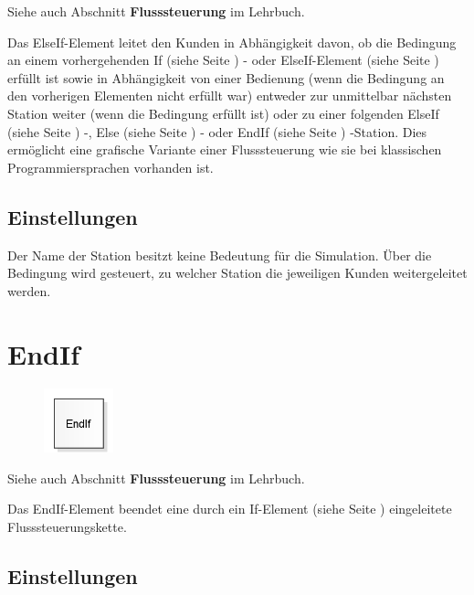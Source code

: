 Siehe auch Abschnitt \textbf{Flusssteuerung} im Lehrbuch.

Das ElseIf-Element leitet den Kunden in Abhängigkeit davon, ob die Bedingung
an einem vorhergehenden If (siehe Seite \pageref{ref:ModelElementLogicIf}) - oder
ElseIf-Element (siehe Seite \pageref{ref:ModelElementLogicElseIf}) erfüllt ist
sowie in Abhängigkeit von einer Bedienung (wenn die Bedingung an den vorherigen
Elementen nicht erfüllt war) entweder zur unmittelbar nächsten Station weiter
(wenn die Bedingung erfüllt ist) oder zu einer folgenden
ElseIf (siehe Seite \pageref{ref:ModelElementLogicElseIf}) -,
Else (siehe Seite \pageref{ref:ModelElementLogicElse}) - oder
EndIf (siehe Seite \pageref{ref:ModelElementLogicEndIf}) -Station.
Dies ermöglicht eine grafische Variante einer Flusssteuerung wie sie bei
klassischen Programmiersprachen vorhanden ist.

\subsection*{Einstellungen}

Der Name der Station besitzt keine Bedeutung für die Simulation. Über die Bedingung
wird gesteuert, zu welcher Station die jeweiligen Kunden weitergeleitet werden.


\section{EndIf}
\label{ref:ModelElementLogicEndIf}

\begin{figure}
\vspace{-22pt}
\includegraphics[width=2cm]{imageModelElementLogicEndIf.png}
\vspace{-22pt}
\end{figure}

Siehe auch Abschnitt \textbf{Flusssteuerung} im Lehrbuch.

Das EndIf-Element beendet eine durch ein
If-Element (siehe Seite \pageref{ref:ModelElementLogicEndIf}) eingeleitete
Flusssteuerungskette.

\subsection*{Einstellungen}

